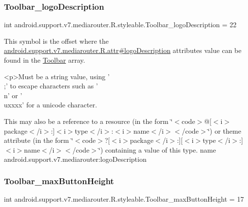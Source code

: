 \subsubsection{\texorpdfstring{Toolbar\+\_\+logo\+Description}{Toolbar\_logoDescription}}
{\footnotesize\ttfamily int android.\+support.\+v7.\+mediarouter.\+R.\+styleable.\+Toolbar\+\_\+logo\+Description = 22\hspace{0.3cm}{\ttfamily [static]}}

This symbol is the offset where the \hyperlink{classandroid_1_1support_1_1v7_1_1mediarouter_1_1R_1_1attr_abbff551ca1e784343cf6ac9acf175951}{android.\+support.\+v7.\+mediarouter.\+R.\+attr\#logo\+Description} attribute\textquotesingle{}s value can be found in the \hyperlink{classandroid_1_1support_1_1v7_1_1mediarouter_1_1R_1_1styleable_a6815cdfaadde30c82b955863af196899}{Toolbar} array.

\begin{DoxyVerb}      <p>Must be a string value, using '\\;' to escape characters such as '\\n' or '\\uxxxx' for a unicode character.
\end{DoxyVerb}
 

This may also be a reference to a resource (in the form \char`\"{}$<$code$>$@\mbox{[}$<$i$>$package$<$/i$>$\+:\mbox{]}$<$i$>$type$<$/i$>$\+:$<$i$>$name$<$/i$>$$<$/code$>$\char`\"{}) or theme attribute (in the form \char`\"{}$<$code$>$?\mbox{[}$<$i$>$package$<$/i$>$\+:\mbox{]}\mbox{[}$<$i$>$type$<$/i$>$\+:\mbox{]}$<$i$>$name$<$/i$>$$<$/code$>$\char`\"{}) containing a value of this type.  name android.\+support.\+v7.\+mediarouter\+:logo\+Description \mbox{\label{classandroid_1_1support_1_1v7_1_1mediarouter_1_1R_1_1styleable_a4ca61dab98fe3ca8b16448d7177099ae}} 
\subsubsection{\texorpdfstring{Toolbar\+\_\+max\+Button\+Height}{Toolbar\_maxButtonHeight}}
{\footnotesize\ttfamily int android.\+support.\+v7.\+mediarouter.\+R.\+styleable.\+Toolbar\+\_\+max\+Button\+Height = 17\hspace{0.3cm}{\ttfamily [static]}}

